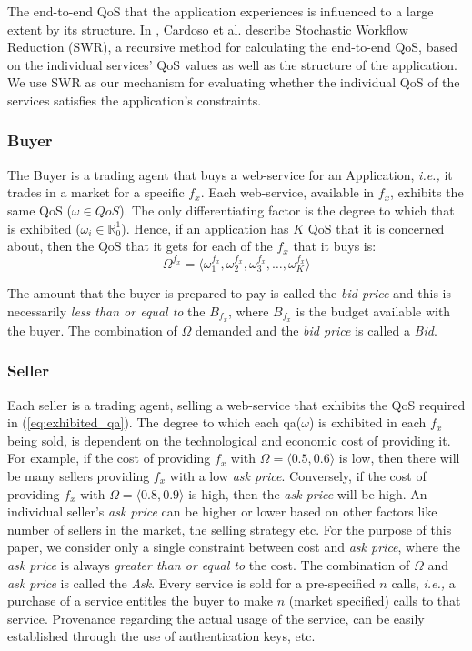 \documentclass[10pt,journal,compsoc]{IEEEtran}
\begin{document}
The end-to-end QoS that the application experiences is influenced to a large extent by its structure. In \cite{Cardoso2004Quality}, Cardoso et al. describe Stochastic Workflow Reduction (SWR), a recursive method for calculating the end-to-end QoS, based on the individual services' QoS values as well as the structure of the application. We use SWR as our mechanism for evaluating whether the individual QoS of the services satisfies the application's constraints. 

\subsubsection{Buyer}
The Buyer is a trading agent that buys a web-service for an Application, \textit{i.e.,} it trades in a market for a specific $f_x$. Each web-service, available in $f_x$, exhibits the same QoS ($\omega \in QoS$). The only differentiating factor is the degree to which that is exhibited  ($ \omega_{i} \in \mathbb{R}_{0}^{1} $). Hence, if an application has $K$ QoS that it is concerned about, then the QoS that it gets for each of the $f_{x}$ that it buys is:
	 \begin{equation}
	  \Omega^{f_{x}} = \langle \omega_{1}^{f_x}, \omega_{2}^{f_x}, \omega_{3}^{f_x}, \ldots, \omega_{K}^{f_x} \rangle \label{eq:exhibited_qa}
	 \end{equation}

The amount that the buyer is prepared to pay is called the \textsl{bid price} and this is necessarily \textit{less than or equal to} the $B_{f_x}$, where $B_{f_x}$ is the budget available with the buyer. The combination of $\Omega$ demanded and the \textsl{bid price} is called a \textsl{Bid}.

\subsubsection{Seller}
Each seller is a trading agent, selling a web-service that exhibits the QoS required in (\ref{eq:exhibited_qa}). The degree to which each qa($\omega$) is exhibited in each $f_x$ being sold, is dependent on the technological and economic cost of providing it. For example, if the cost of providing $f_x$ with $\Omega = \langle 0.5, 0.6 \rangle$ is low, then there will be many sellers providing $f_x$ with a low \textsl{ask price}. Conversely, if the cost of providing $f_x$ with $\Omega = \langle 0.8, 0.9 \rangle$ is high, then the \textsl{ask price} will be high. An individual seller's \textsl{ask price} can be higher or lower based on other factors like number of sellers in the market, the selling strategy etc. For the purpose of this paper, we consider only a single constraint between cost and \textsl{ask price}, where the \textsl{ask price} is always \textit{greater than or equal to} the cost. The combination of $\Omega$ and \textsl{ask price} is called the \textsl{Ask}. Every service is sold for a pre-specified $n$ calls, \textit{i.e.,} a purchase of a service entitles the buyer to make $n$ (market specified) calls to that service. Provenance regarding the actual usage of the service, can be easily established through the use of authentication keys, etc. 
\end{document}

